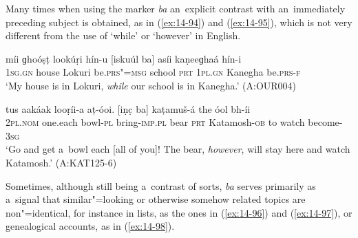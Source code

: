 Many times when using the marker \textit{ba} an~explicit contrast with an~immediately preceding subject is obtained, as in (\ref{ex:14-94}) and (\ref{ex:14-95}), which is not very different from the use of `while' or `however' in English.

\begin{exe}
\ex
\label{ex:14-94}
\gll míi ɡhoóṣṭ lookúṛi hín-u [iskuúl ba] asíi  kaṇeeɡhaá hín-i \\
\textsc{1sg.gn} house Lokuri be.\textsc{prs"=msg} school \textsc{prt} \textsc{1pl.gn} Kanegha be.\textsc{prs-f } \\
\glt `My house is in Lokuri, \textit{while} our school is in Kanegha.' (A:OUR004)

\ex
\label{ex:14-95}
\gll tus aakáak looṛíi-a aṭ-óoi. [iṇc̣ ba]  kaṭamuš-á the óol bh-íi \\
\textsc{2pl.nom} one.each bowl-\textsc{pl} bring-\textsc{imp.pl} bear \textsc{prt}  Katamosh-\textsc{ob} to watch become-\textsc{3sg } \\
\glt `Go and get a~bowl each [all of you]! The bear, \textit{however}, will stay here and watch Katamosh.' (A:KAT125-6)
\end{exe}

Sometimes, although still being a~contrast of sorts, \textit{ba} serves primarily as a~signal that similar"=looking or otherwise somehow related topics are non"=identical, for instance in lists, as the ones in (\ref{ex:14-96}) and (\ref{ex:14-97}), or genealogical accounts, as in (\ref{ex:14-98}). 

